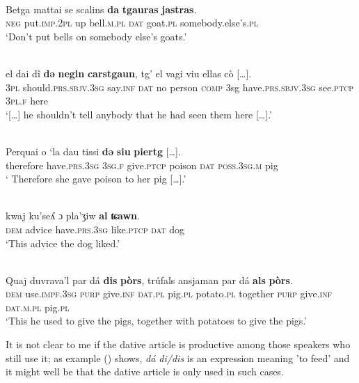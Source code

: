 \ea\label{}
\\
\gll Betga mattai se scalins \textbf{da} \textbf{tgauras} \textbf{jastras}.\\
     \textsc{neg} put.\textsc{imp.2pl} up bell.\textsc{m.pl} \textsc{dat} goat.\textsc{pl} somebody.else’s.\textsc{pl}\\
\glt `Don’t put bells on somebody else’s goats.'
\z


\ea\label{}
\\
\gll […] el dai dî \textbf{də} \textbf{negin} \textbf{carstgaun}, tg’ el vagi viu ellas cò […].\\
     […] \textsc{3pl}  should.\textsc{prs.sbjv.3sg} say.\textsc{inf} \textsc{dat} no person \textsc{comp} 3sg have.\textsc{prs.sbjv.3sg} see.\textsc{ptcp} \textsc{3pl.f} here\\
\glt `[…] he shouldn’t tell anybody that he had seen them here […].'
\z

\ea\label{}
\\
\gll Perquai o ‘la dau tissi \textbf{dǝ} \textbf{siu} \textbf{piertg} […].\\
     therefore have.\textsc{prs.3sg} \textsc{3sg.f} give.\textsc{ptcp} poison \textsc{dat} \textsc{poss.3sg.m} pig \\
\glt ` Therefore she gave poison to her pig […].'
\z

\ea\label{}
\\
\gll kwaj ku'seʎ ɔ pla'ʒiw \textbf{al} \textbf{ʨawn}.\\
    \textsc{dem} advice have.\textsc{prs.3sg} like.\textsc{ptcp} \textsc{dat} dog\\
\glt `This advice the dog liked.'
\z

\ea\label{}
\\
\gll   Quaj duvrava’l par dá \textbf{dis} \textbf{pòrs}, trúfals ansjaman par dá \textbf{als} \textbf{pòrs}. \\
 \textsc{dem} use.\textsc{impf.3sg} \textsc{purp} give.\textsc{inf}  \textsc{dat.pl} pig.\textsc{pl} potato.\textsc{pl} together  \textsc{purp}  give.\textsc{inf} \textsc{dat.m.pl} pig.\textsc{pl} \\
\glt `This he used to give the pigs, together with potatoes to give the pigs.'
\z

It is not clear to me if the dative article is productive among those speakers who still use it; as example () shows, \textit{dá di/dis} is an expression meaning 'to feed' and it might well be that the dative article is only used in such cases.

